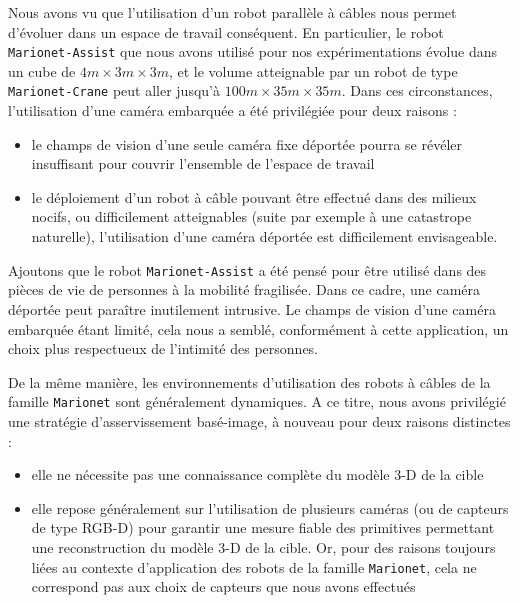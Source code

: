 Nous avons vu que l'utilisation d'un robot parallèle à câbles nous permet d'évoluer dans un espace de travail conséquent. En particulier, le robot {\tt Marionet-Assist} que nous avons utilisé pour nos expérimentations évolue dans un cube de $4m \times 3m \times 3m$, et le volume atteignable par un robot de type {\tt Marionet-Crane} peut aller jusqu'à $100m \times 35m \times 35m$. Dans ces circonstances, l'utilisation d'une caméra embarquée a été privilégiée pour deux raisons :
\begin{itemize}
 \item le champs de vision d'une seule caméra fixe déportée pourra se révéler insuffisant pour couvrir l'ensemble de l'espace de travail
 \item le déploiement d'un robot à câble pouvant être effectué dans des milieux nocifs, ou difficilement atteignables (suite par exemple à une catastrope naturelle), l'utilisation d'une caméra déportée est difficilement envisageable.
\end{itemize}

Ajoutons que le robot {\tt Marionet-Assist} a été pensé pour être utilisé dans des pièces de vie de personnes à la mobilité fragilisée. Dans ce cadre, une caméra déportée peut paraître inutilement intrusive. Le champs de vision d'une caméra embarquée étant limité, cela nous a semblé, conformément à cette application, un choix plus respectueux de l'intimité des personnes. 

De la même manière, les environnements d'utilisation des robots à câbles de la famille {\tt Marionet} sont généralement dynamiques. A ce titre, nous avons privilégié une stratégie d'asservissement basé-image, à nouveau pour deux raisons distinctes :
\begin{itemize}
\item elle ne nécessite pas une connaissance complète du modèle 3-D de la cible 
\item elle repose généralement sur l'utilisation de plusieurs caméras (ou de capteurs de type RGB-D) pour garantir une mesure fiable des primitives permettant une reconstruction du modèle 3-D de la cible. Or, pour des raisons toujours liées au contexte d'application des robots de la famille {\tt Marionet}, cela ne correspond pas aux choix de capteurs que nous avons effectués
\end{itemize}

